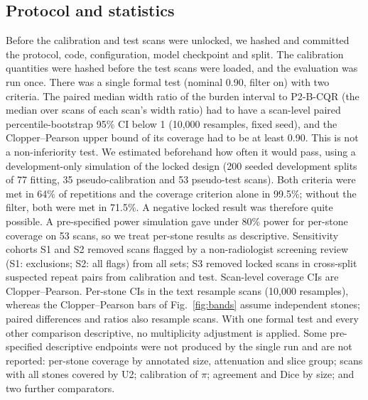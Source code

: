 \documentclass[conference]{IEEEtran}
\begin{document}
\subsection{Protocol and statistics}
Before the calibration and test scans were unlocked, we hashed and committed the protocol, code, configuration, model checkpoint and split. The calibration quantities were hashed before the test scans were loaded, and the evaluation was run once. There was a single formal test (nominal 0.90, filter on) with two criteria. The paired median width ratio of the burden interval to P2-B-CQR (the median over scans of each scan's width ratio) had to have a scan-level paired percentile-bootstrap 95\% CI below 1 (10{,}000 resamples, fixed seed), and the Clopper--Pearson upper bound of its coverage had to be at least 0.90. This is not a non-inferiority test. We estimated beforehand how often it would pass, using a development-only simulation of the locked design (200 seeded development splits of 77 fitting, 35 pseudo-calibration and 53 pseudo-test scans). Both criteria were met in 64\% of repetitions and the coverage criterion alone in 99.5\%; without the filter, both were met in 71.5\%. A negative locked result was therefore quite possible. A pre-specified power simulation gave under 80\% power for per-stone coverage on 53 scans, so we treat per-stone results as descriptive. Sensitivity cohorts S1 and S2 removed scans flagged by a non-radiologist screening review (S1: exclusions; S2: all flags) from all sets; S3 removed locked scans in cross-split suspected repeat pairs from calibration and test. Scan-level coverage CIs are Clopper--Pearson. Per-stone CIs in the text resample scans (10{,}000 resamples), whereas the Clopper--Pearson bars of Fig.~\ref{fig:bands} assume independent stones; paired differences and ratios also resample scans. With one formal test and every other comparison descriptive, no multiplicity adjustment is applied. Some pre-specified descriptive endpoints were not produced by the single run and are not reported: per-stone coverage by annotated size, attenuation and slice group; scans with all stones covered by U2; calibration of $\pi$; agreement and Dice by size; and two further comparators.
\end{document}
